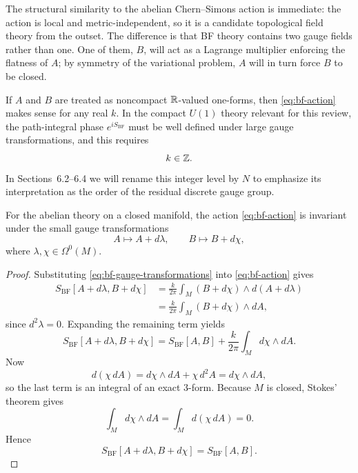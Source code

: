 \noindent The structural similarity to the abelian Chern--Simons action is immediate: the action is local and metric-independent, so it is a candidate topological field theory from the outset. The difference is that BF theory contains two gauge fields rather than one. One of them, $B$, will act as a Lagrange multiplier enforcing the flatness of $A$; by symmetry of the variational problem, $A$ will in turn force $B$ to be closed.

\medskip

\noindent If $A$ and $B$ are treated as noncompact $\mathbb{R}$-valued one-forms, then \eqref{eq:bf-action} makes sense for any real $k$. In the compact $U(1)$ theory relevant for this review, the path-integral phase $e^{iS_{\mathrm{BF}}}$ must be well defined under large gauge transformations, and this requires
\begin{equation}\label{eq:bf-level-integral}
k\in \mathbb{Z}.
\end{equation}
In Sections~6.2--6.4 we will rename this integer level by $N$ to emphasize its interpretation as the order of the residual discrete gauge group.

\begin{proposition}\label{prop:bf-gauge}
For the abelian theory on a closed manifold, the action \eqref{eq:bf-action} is invariant under the small gauge transformations
\begin{equation}\label{eq:bf-gauge-transformations}
A \longmapsto A + d\lambda,
\qquad
B \longmapsto B + d\chi,
\end{equation}
where $\lambda,\chi \in \Omega^0(M)$.
\end{proposition}

\begin{proof}
Substituting \eqref{eq:bf-gauge-transformations} into \eqref{eq:bf-action} gives
\begin{align*}
S_{\mathrm{BF}}[A+d\lambda,B+d\chi]
&=
\frac{k}{2\pi}\int_M (B+d\chi)\wedge d(A+d\lambda) \\
&=
\frac{k}{2\pi}\int_M (B+d\chi)\wedge dA,
\end{align*}
since $d^2\lambda=0$. Expanding the remaining term yields
\begin{equation*}
S_{\mathrm{BF}}[A+d\lambda,B+d\chi]
=
S_{\mathrm{BF}}[A,B]
+
\frac{k}{2\pi}\int_M d\chi\wedge dA.
\end{equation*}
Now
\begin{equation*}
d(\chi\, dA)=d\chi\wedge dA + \chi\, d^2A = d\chi\wedge dA,
\end{equation*}
so the last term is an integral of an exact $3$-form. Because $M$ is closed, Stokes' theorem gives
\begin{equation*}
\int_M d\chi\wedge dA = \int_M d(\chi\, dA)=0.
\end{equation*}
Hence
\begin{equation*}
S_{\mathrm{BF}}[A+d\lambda,B+d\chi]=S_{\mathrm{BF}}[A,B].
\end{equation*}
\end{proof}


